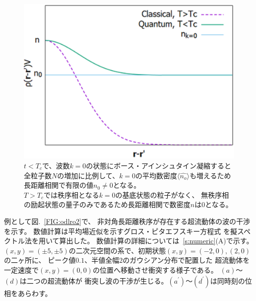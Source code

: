 \documentclass[12pt,a4paper]{jbook}
\begin{document}
		\begin{figure}[H]
			\begin{center}
				\includegraphics[width=14cm]{odlro.eps}
				\caption{
					$t<T_c$で、波数$k=0$の状態にボース・アインシュタイン凝縮すると
					全粒子数$N$の増加に比例して、$k=0$の平均数密度$\langle \hat{n_o} \rangle$も増えるため
					長距離相関で有限の値$n_0 \neq 0$となる。
                    \\
					$T>T_c$では秩序相となる$k=0$の基底状態の粒子がなく、
                    無秩序相の励起状態の量子のみであるため長距離相関で数密度$n$は$0$となる。
				}
				\label{FIG:odlro}
			\end{center}
		\end{figure}
		例として図.~\ref{FIG:odlro2}で、
		非対角長距離秩序が存在する超流動体の波の干渉を示す。
        数値計算は平均場近似を示すグロス・ピタエフスキー方程式
        を擬スペクトル法を用いて算出した。
        数値計算の詳細については~\ref{s:numeric}(A)で示す。
        $(x,y)=(\pm5,\pm5)$の二次元空間の系で、初期状態$(x,y)=(-2,0),(2,0)$の二ヶ所に、
        ピーク値$0.1$、半値全幅$2$のガウシアン分布で配置した
        超流動体を一定速度で$(x,y)=(0,0)$の位置へ移動させ衝突する様子である。
        $(a)$～$(d)$は二つの超流動体が
        衝突し波の干渉が生じる。$(a^\prime)$～$(d^\prime)$は同時刻の位相をあらわす。
\end{document}
